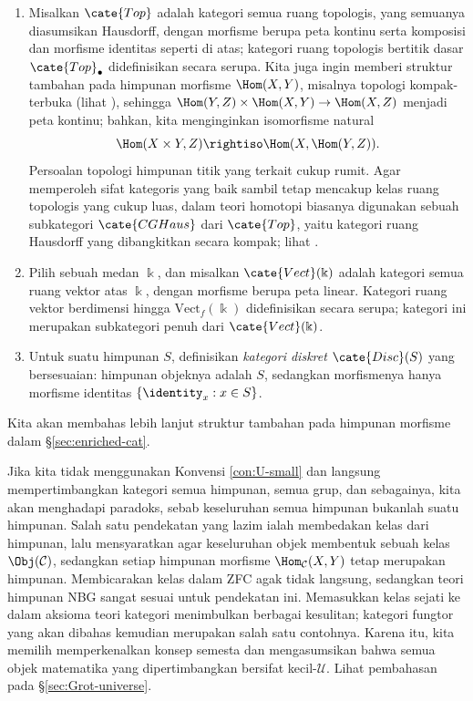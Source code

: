 \begin{example}
\begin{enumerate}
		\[ (f + g) h = fh + gh, \quad h(f+g) = hf + hg. \]
		Ini merupakan kasus khusus kategori-$\cate{Ab}$, yang akan dibahas lebih lanjut dalam Contoh \ref{eg:Ab-cat}.
		\item Misalkan $\cate{Top}$ adalah kategori semua ruang topologis, yang semuanya diasumsikan Hausdorff, dengan morfisme berupa peta kontinu serta komposisi dan morfisme identitas seperti di atas; kategori ruang topologis bertitik dasar $\cate{Top}_\bullet$ didefinisikan secara serupa. Kita juga ingin memberi struktur tambahan pada himpunan morfisme $\Hom(X,Y)$, misalnya topologi kompak-terbuka (lihat \cite[\S 9.3]{Xiong}), sehingga $\Hom(Y, Z) \times \Hom(X, Y) \to \Hom(X, Z)$ menjadi peta kontinu; bahkan, kita menginginkan isomorfisme natural 
			\[ \Hom(X \times Y, Z) \rightiso \Hom(X, \Hom(Y, Z)). \]
			Persoalan topologi himpunan titik yang terkait cukup rumit. Agar memperoleh sifat kategoris yang baik sambil tetap mencakup kelas ruang topologis yang cukup luas, dalam teori homotopi biasanya digunakan sebuah subkategori $\cate{CGHaus}$ dari $\cate{Top}$, yaitu kategori ruang Hausdorff yang dibangkitkan secara kompak; lihat \cite[Bab 5]{May99}.
		\item Pilih sebuah medan $\Bbbk$, dan misalkan $\cate{Vect}(\Bbbk)$ adalah kategori semua ruang vektor atas $\Bbbk$, dengan morfisme berupa peta linear. Kategori ruang vektor berdimensi hingga $\text{Vect}_f(\Bbbk)$ didefinisikan secara serupa; kategori ini merupakan subkategori penuh dari $\cate{Vect}(\Bbbk)$. 
		\item Untuk suatu himpunan $S$, definisikan \emph{kategori diskret} $\cate{Disc}(S)$ yang bersesuaian: himpunan objeknya adalah $S$, sedangkan morfismenya hanya morfisme identitas $\{ \identity_x : x \in S \}$.
	\end{enumerate}
	Kita akan membahas lebih lanjut struktur tambahan pada himpunan morfisme dalam \S\ref{sec:enriched-cat}.
\end{example}

\begin{remark}
	Jika kita tidak menggunakan Konvensi \ref{con:U-small} dan langsung mempertimbangkan kategori semua himpunan, semua grup, dan sebagainya, kita akan menghadapi paradoks, sebab keseluruhan semua himpunan bukanlah suatu himpunan. Salah satu pendekatan yang lazim ialah membedakan kelas dari himpunan, lalu mensyaratkan agar keseluruhan objek membentuk sebuah kelas $\Obj(\mathcal{C})$, sedangkan setiap himpunan morfisme $\Hom_{\mathcal{C}}(X,Y)$ tetap merupakan himpunan. Membicarakan kelas dalam ZFC agak tidak langsung, sedangkan teori himpunan NBG sangat sesuai untuk pendekatan ini. Memasukkan kelas sejati ke dalam aksioma teori kategori menimbulkan berbagai kesulitan; kategori fungtor yang akan dibahas kemudian merupakan salah satu contohnya. Karena itu, kita memilih memperkenalkan konsep semesta dan mengasumsikan bahwa semua objek matematika yang dipertimbangkan bersifat kecil-$\mathcal{U}$. Lihat pembahasan pada \S\ref{sec:Grot-universe}.
\end{remark}

